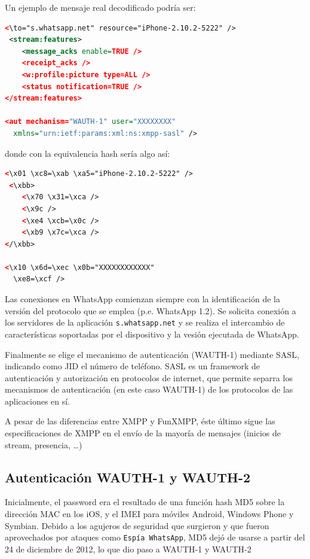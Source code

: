 \documentclass[a4paper, 11pt]{article} %
\begin{document}
Un ejemplo de mensaje real decodificado podría ser:

\begin{lstlisting}[language=XML] 
 <\to="s.whatsapp.net" resource="iPhone-2.10.2-5222" />
 <stream:features>
    <message_acks enable=TRUE />
    <receipt_acks />
    <w:profile:picture type=ALL />
    <status notification=TRUE />
</stream:features>

<aut mechanism="WAUTH-1" user="XXXXXXXX"
  xmlns="urn:ietf:params:xml:ns:xmpp-sasl" />
\end{lstlisting}

donde con la equivalencia hash sería algo así:
\begin{lstlisting}[language=XML] 
 <\x01 \xc8=\xab \xa5="iPhone-2.10.2-5222" />
 <\xbb>
    <\x70 \x31=\xca />
    <\x9c />
    <\xe4 \xcb=\x0c />
    <\xb9 \x7c=\xca />
</\xbb>

<\x10 \x6d=\xec \x0b="XXXXXXXXXXXX"
  \xe8=\xcf />
\end{lstlisting}

Las conexiones en WhatsApp comienzan siempre con la identificación de la versión del protocolo que se emplea (p.e. 
WhatsApp 1.2). Se solicita conexión a los servidores de la aplicación \texttt{s.whatsapp.net} y se realiza el intercambio
de características soportadas por el dispositivo y la vesión ejecutada de WhatsApp.

Finalmente se elige el mecanismo de autenticación (WAUTH-1) mediante SASL, indicando como JID el número de teléfono.
SASL es un framework de autenticación y autorización en protocolos de internet, que permite separra los mecanismos de
autenticación (en este caso WAUTH-1) de los protocolos de las aplicaciones en sí.

A pesar de las diferencias entre XMPP y FunXMPP, éste último sigue las especificaciones de XMPP en el envío de la
mayoría de mensajes (inicios de stream, presencia, \ldots)

\subsection{Autenticación WAUTH-1 y WAUTH-2}
Inicialmente, el password era el resultado de una función hash MD5 sobre la dirección MAC en los iOS, y el IMEI para
móviles Android, Windows Phone y Symbian.
Debido a los agujeros de seguridad que surgieron y que fueron aprovechados por ataques como \texttt{Espía WhatsApp},
MD5 dejó de usarse a partir del 24 de diciembre de 2012, lo que dio paso a WAUTH-1 y WAUTH-2
\end{document}
